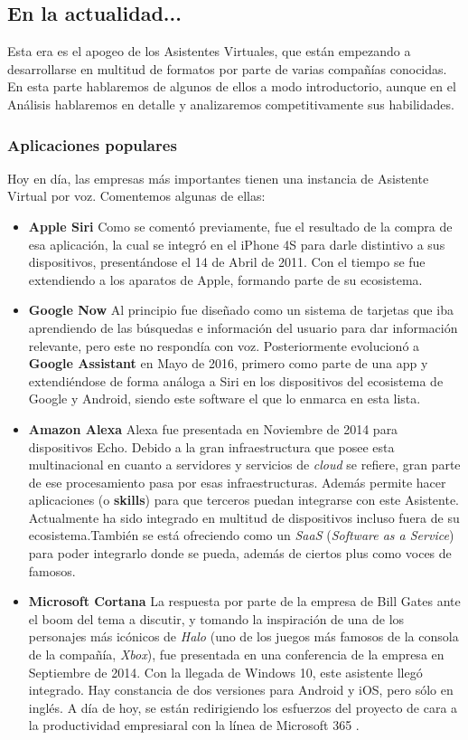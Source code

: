 \subsection{En la actualidad...}
Esta era es el apogeo de los Asistentes Virtuales, que están empezando a desarrollarse en multitud de formatos por parte de varias compañías conocidas. En esta parte hablaremos de algunos de ellos a modo introductorio, aunque en el Análisis hablaremos en detalle y analizaremos competitivamente sus habilidades.

\subsubsection {Aplicaciones populares}
Hoy en día, las empresas más importantes tienen una instancia de Asistente Virtual por voz. Comentemos algunas de ellas:

\begin{itemize}
	\item \textbf{Apple Siri} \cite{siri} Como se comentó previamente, fue el resultado de la compra de esa aplicación, la cual se integró en el iPhone 4S para darle distintivo a sus dispositivos, presentándose el 14 de Abril de 2011. Con el tiempo se fue extendiendo a los aparatos de Apple, formando parte de su ecosistema.
	\item \textbf{Google Now} Al principio fue diseñado como un sistema de tarjetas que iba aprendiendo de las búsquedas e información del usuario para dar información relevante, pero este no respondía con voz. Posteriormente evolucionó a \textbf{Google Assistant} \cite{google-assistant} en Mayo de 2016, primero como parte de una app y extendiéndose de forma análoga a Siri en los dispositivos del ecosistema de Google y Android, siendo este software el que lo enmarca en esta lista.
	\item \textbf{Amazon Alexa} \cite{alexa} Alexa fue presentada en Noviembre de 2014 para dispositivos Echo. Debido a la gran infraestructura que posee esta multinacional en cuanto a servidores y servicios de \textit{cloud} se refiere, gran parte de ese procesamiento pasa por esas infraestructuras. Además permite hacer aplicaciones (o \textbf{skills}) para que terceros puedan integrarse con este Asistente. Actualmente ha sido integrado en multitud de dispositivos incluso fuera de su ecosistema.También se está ofreciendo como un \textit{SaaS} (\textit{Software as a Service}) para poder integrarlo donde se pueda, además de ciertos plus como voces de famosos.
	\item \textbf{Microsoft Cortana} La respuesta por parte de la empresa de Bill Gates ante el boom del tema a discutir, y tomando la inspiración de una de los personajes más icónicos de \textit{Halo} (uno de los juegos más famosos de la consola de la compañía, \textit{Xbox}), fue presentada en una conferencia de la empresa en Septiembre de 2014. Con la llegada de Windows 10, este asistente llegó integrado. Hay constancia de dos versiones para Android y iOS, pero sólo en inglés. A día de hoy, se están redirigiendo los esfuerzos del proyecto de cara a la productividad empresiaral con la línea de Microsoft 365 \cite{cortana}.
\end{itemize}

